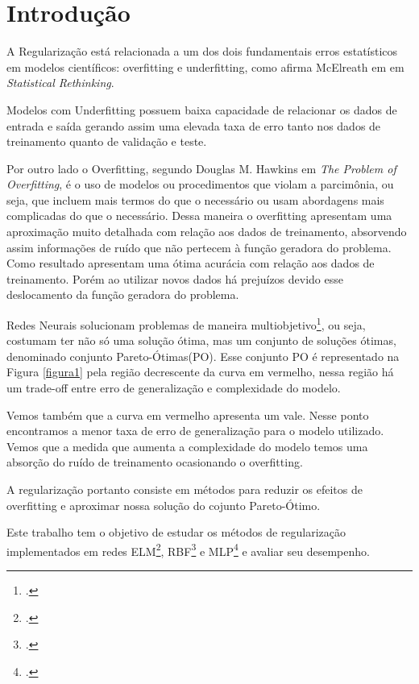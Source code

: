 \section{Introdução}
A Regularização está relacionada a um dos dois fundamentais erros estatísticos em modelos científicos: overfitting e underfitting, como afirma McElreath em em \emph{Statistical Rethinking}\cite{mcelreath2016statistical}.

Modelos com Underfitting possuem baixa capacidade de relacionar os dados de entrada e saída gerando assim uma elevada taxa de erro tanto nos dados de treinamento quanto de validação e teste.

Por outro lado o Overfitting, segundo Douglas M. Hawkins em \emph{The Problem of Overfitting}\cite{OverfittigProblems}, é o uso de modelos ou procedimentos que violam a parcimônia, ou seja, que incluem mais termos do que o necessário ou usam abordagens mais complicadas do que o necessário.\cite*{OverfittigProblems}
Dessa maneira o overfitting apresentam uma aproximação muito detalhada com relação aos dados de treinamento, absorvendo assim informações de ruído que não pertecem à função geradora do problema.
Como resultado apresentam uma ótima acurácia com relação aos dados de treinamento. Porém ao utilizar novos dados há prejuízos devido esse deslocamento da função geradora do problema.

Redes Neurais solucionam problemas de maneira multiobjetivo\footcite{Problemas multiobjetivo: Problemas com mais de um objetivo}, ou seja, costumam ter não só uma solução ótima, mas um conjunto de soluções ótimas, denominado conjunto Pareto-Ótimas(PO).
Esse conjunto PO é representado na Figura \ref*{figura1} pela região decrescente da curva em vermelho, nessa região há um trade-off entre erro de generalização e complexidade do modelo.

Vemos também que a curva em vermelho apresenta um vale. Nesse ponto encontramos a menor taxa de erro de generalização para o modelo utilizado.
Vemos que a medida que aumenta a complexidade do modelo temos uma absorção do ruído de treinamento ocasionando o overfitting.

A regularização portanto consiste em métodos para reduzir os efeitos de overfitting e aproximar nossa solução do cojunto Pareto-Ótimo.

Este trabalho tem o objetivo de estudar os métodos de regularização implementados em redes ELM\footcite{ELM: Extreme Learning Machines},  RBF\footcite{RBF: Radial Basis Function} e MLP\footcite[]{MLP: Multilayer Perceptron} e avaliar seu desempenho.

